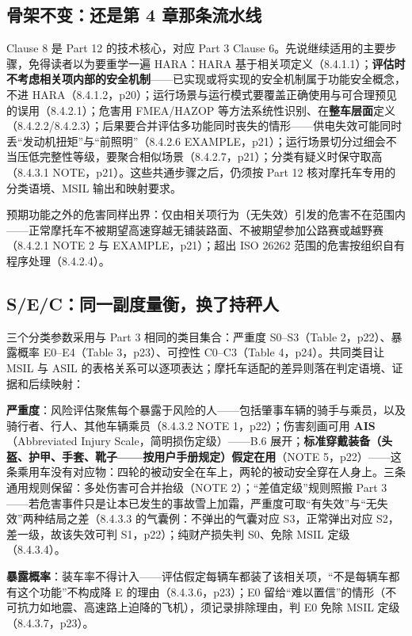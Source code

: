 \subsection{骨架不变：还是第 4 章那条流水线}

Clause 8 是 Part 12 的技术核心，对应 Part 3 Clause 6。先说继续适用的主要步骤，免得读者以为要重学一遍 HARA：HARA 基于相关项定义（8.4.1.1）；\textbf{评估时不考虑相关项内部的安全机制}——已实现或将实现的安全机制属于功能安全概念，不进 HARA（8.4.1.2，p20）；运行场景与运行模式要覆盖正确使用与可合理预见的误用（8.4.2.1）；危害用 FMEA/HAZOP 等方法系统性识别、在\textbf{整车层面}定义（8.4.2.2/8.4.2.3）；后果要合并评估多功能同时丧失的情形——供电失效可能同时丢“发动机扭矩”与“前照明”（8.4.2.6 EXAMPLE，p21）；运行场景切分过细会不当压低完整性等级，要聚合相似场景（8.4.2.7，p21）；分类有疑义时保守取高（8.4.3.1 NOTE，p21）。这些共通步骤之后，仍须按 Part 12 核对摩托车专用的分类语境、MSIL 输出和映射要求。

预期功能之外的危害同样出界：仅由相关项行为（无失效）引发的危害不在范围内——正常摩托车不被期望高速穿越无铺装路面、不被期望参加公路赛或越野赛（8.4.2.1 NOTE 2 与 EXAMPLE，p21）；超出 ISO 26262 范围的危害按组织自有程序处理（8.4.2.4）。

\subsection{S/E/C：同一副度量衡，换了持秤人}

三个分类参数采用与 Part 3 相同的类目集合：严重度 S0–S3（Table 2，p22）、暴露概率 E0–E4（Table 3，p23）、可控性 C0–C3（Table 4，p24）。共同类目让 MSIL 与 ASIL 的表格关系可以逐项表达；摩托车适配的差异则落在判定语境、证据和后续映射：

\textbf{严重度}：风险评估聚焦每个暴露于风险的人——包括肇事车辆的骑手与乘员，以及骑行者、行人、其他车辆乘员（8.4.3.2 NOTE 1，p22）；伤害刻画可用 \textbf{AIS}（Abbreviated Injury Scale，简明损伤定级）——B.6 展开；\textbf{标准穿戴装备（头盔、护甲、手套、靴子——按用户手册规定）假定在用}（NOTE 5，p22）——这条乘用车没有对应物：四轮的被动安全在车上，两轮的被动安全穿在人身上。三条通用规则保留：多处伤害可合并抬级（NOTE 2）；“差值定级”规则照搬 Part 3——若危害事件只是让本已发生的事故雪上加霜，严重度可取“有失效”与“无失效”两种结局之差（8.4.3.3 的气囊例：不弹出的气囊对应 S3，正常弹出对应 S2，差一级，故该失效可判 S1，p22）；纯财产损失判 S0、免除 MSIL 定级（8.4.3.4）。

\textbf{暴露概率}：装车率不得计入——评估假定每辆车都装了该相关项，“不是每辆车都有这个功能”不构成降 E 的理由（8.4.3.6，p23）；E0 留给“难以置信”的情形（不可抗力如地震、高速路上迫降的飞机），须记录排除理由，判 E0 免除 MSIL 定级（8.4.3.7，p23）。

